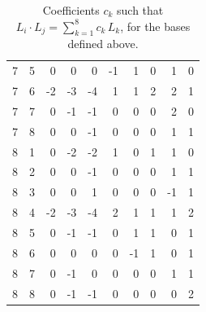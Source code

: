 \documentclass[twoside,english]{paper}
\numberwithin{equation}{section}
\numberwithin{figure}{section}
\theoremstyle{definition}
\theoremstyle{remark}
\begin{document}
\begin{table}[H]
\begin{minipage}[t]{0.48\textwidth}
\begin{tabular}{cc|rrrrrrrr}
7 & 5 & 0 & 0 & 0 & -1 & 1 & 0 & 1 & 0 \\
7 & 6 & -2 & -3 & -4 & 1 & 1 & 2 & 2 & 1 \\
7 & 7 & 0 & -1 & -1 & 0 & 0 & 0 & 2 & 0 \\
7 & 8 & 0 & 0 & -1 & 0 & 0 & 0 & 1 & 1 \\
\midrule
8 & 1 & 0 & -2 & -2 & 1 & 0 & 1 & 1 & 0 \\
8 & 2 & 0 & 0 & -1 & 0 & 0 & 0 & 1 & 1 \\
8 & 3 & 0 & 0 & 1 & 0 & 0 & 0 & -1 & 1 \\
8 & 4 & -2 & -3 & -4 & 2 & 1 & 1 & 1 & 2 \\
8 & 5 & 0 & -1 & -1 & 0 & 1 & 1 & 0 & 1 \\
8 & 6 & 0 & 0 & 0 & 0 & -1 & 1 & 0 & 1 \\
8 & 7 & 0 & -1 & 0 & 0 & 0 & 0 & 1 & 1 \\
8 & 8 & 0 & -1 & -1 & 0 & 0 & 0 & 0 & 2 \\
\bottomrule
\end{tabular}
\end{minipage}
\caption{Coefficients $c_k$ such that $L_i \cdot L_j = \sum_{k=1}^{8} c_k\, L_k$, for the bases defined above.}\label{tbl:appendix-LL}
\end{table}
\end{document}
